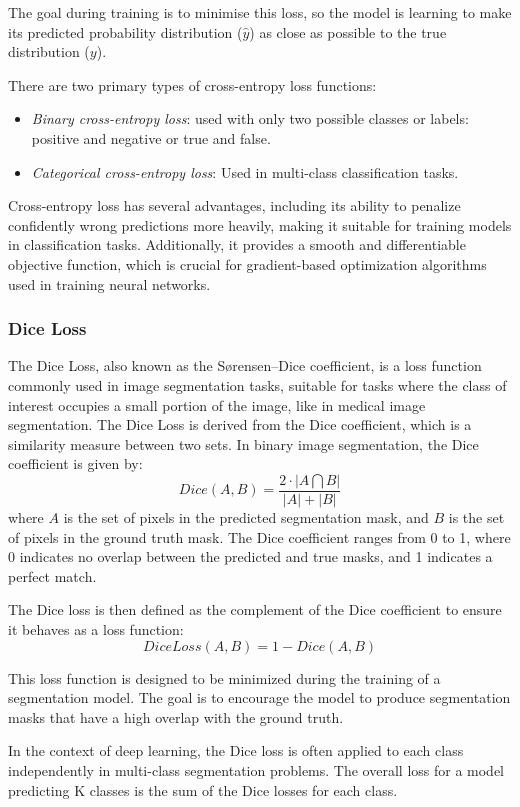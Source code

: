 The goal during training is to minimise this loss, so the model is learning to make its predicted probability distribution ($\hat{y}$) as close as possible to the true distribution ($y$).

There are two primary types of cross-entropy loss functions:
\begin{itemize}
    \item \textit{Binary cross-entropy loss}: used with only two possible classes or labels: positive and negative or true and false.
    \item \textit{Categorical cross-entropy loss}: Used in multi-class classification tasks.
\end{itemize}

Cross-entropy loss has several advantages, including its ability to penalize confidently wrong predictions more heavily, making it suitable for training models in classification tasks. Additionally, it provides a smooth and differentiable objective function, which is crucial for gradient-based optimization algorithms used in training neural networks.

\subsubsection{Dice Loss}
The Dice Loss, also known as the Sørensen–Dice coefficient, is a loss function commonly used in image segmentation tasks, suitable for tasks where the class of interest occupies a small portion of the image, like in medical image segmentation.
The Dice Loss is derived from the Dice coefficient, which is a similarity measure between two sets. In binary image segmentation, the Dice coefficient is given by:
$$Dice(A, B) = \frac{2 \cdot |A \bigcap B|}{|A| + |B|}$$
where $A$ is the set of pixels in the predicted segmentation mask, and $B$ is the set of pixels in the ground truth mask.
The Dice coefficient ranges from 0 to 1, where 0 indicates no overlap between the predicted and true masks, and 1 indicates a perfect match.

The Dice loss is then defined as the complement of the Dice coefficient to ensure it behaves as a loss function:
$$DiceLoss(A,B) = 1 - Dice(A, B)$$

This loss function is designed to be minimized during the training of a segmentation model. The goal is to encourage the model to produce segmentation masks that have a high overlap with the ground truth.

In the context of deep learning, the Dice loss is often applied to each class independently in multi-class segmentation problems. The overall loss for a model predicting K classes is the sum of the Dice losses for each class.

